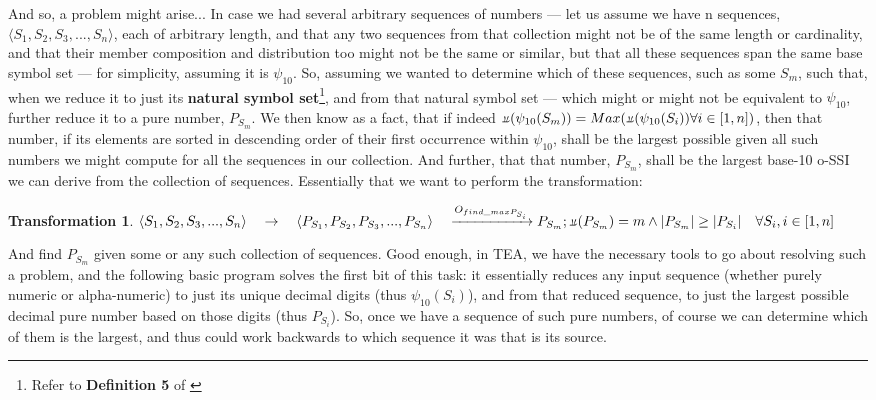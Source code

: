 \documentclass[a4paper, 18pt]{book} %
\newtheorem{trans}{Transformation}
\newcommand{\invpi}{\rotatebox[origin=c]{180}{$\pi$}}
\begin{document}
And so, a problem might arise... In case we had several arbitrary sequences of numbers --- let us assume we have n sequences, $\langle S_1, S_2, S_3,...,S_n \rangle$, each of arbitrary length, and that any two sequences from that collection might not be of the same length or cardinality, and that their member composition and distribution too might not be the same or similar, but that all these sequences span the same base symbol set --- for simplicity, assuming it is $\psi_{10}$. So, assuming we wanted to determine which of these sequences, such as some $S_m$, such that, when we reduce it to just its \textbf{natural symbol set}\footnote{Refer to \textbf{Definition 5} of \cite{ossipaper}}, and from that natural symbol set --- which might or might not be equivalent to $\psi_{10}$, further reduce it to a pure number, $P_{S_m}$. We then know as a fact, that if indeed $\invpi(\psi_{10}(S_m)) = Max(\invpi(\psi_{10}(S_i)) \forall i \in [1,n])$, then that number, if its elements are sorted in descending order of their first occurrence within $\psi_{10}$, shall be the largest possible given all such numbers we might compute for all the sequences in our collection. And further, that that number, $P_{S_m}$, shall be the largest base-10 o-SSI we can derive from the collection of sequences. Essentially that we want to perform the transformation:

\begin{trans}
\label{TRANSB1}
$\langle S_1, S_2, S_3,...,S_n \rangle \quad  \rightarrow \quad \langle P_{S_1}, P_{S_2}, P_{S_3},..., P_{S_n} \rangle  \quad \xrightarrow{O_{find\_max P_{S_i}}} P_{S_m};\\
\invpi(P_{S_m}) = m\\
\land |P_{S_m}| \geq |P_{S_i}| \quad \forall S_i, i \in [1,n]$ 
\end{trans}

And find $P_{S_m}$ given some or any such collection of sequences. Good enough, in TEA, we have the necessary tools to go about resolving such a problem, and the following basic program solves the first bit of this task: it essentially reduces any input sequence (whether purely numeric or alpha-numeric) to just its unique decimal digits (thus $\psi_{10}(S_i)$), and from that reduced sequence, to just the largest possible decimal pure number based on those digits (thus $P_{S_i}$). So, once we have a sequence of such pure numbers, of course we can determine which of them is the largest, and thus could work backwards to which sequence it was that is its source.
\end{document}
